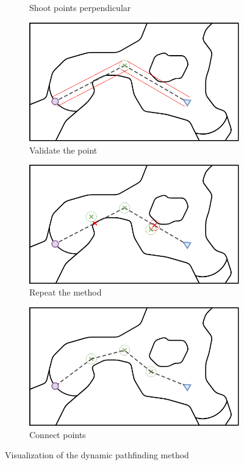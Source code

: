 \documentclass[../main.tex]{subfiles}
\begin{document}
\begin{figure}[H]
\begin{subfigure}[b]{0.45\textwidth}
		\caption{Shoot points perpendicular}
		\label{fig:shoot_line}
	\end{subfigure}
	\hfill
	\begin{subfigure}[b]{0.45\textwidth}
		\centering
		\includegraphics[width=\textwidth]{IMAGES/part3/methode4.png}
		\caption{Validate the point}
		\label{fig:validate_point}
	\end{subfigure}
	\vfill
	\begin{subfigure}[b]{0.45\textwidth}
		\centering
		\includegraphics[width=\textwidth]{IMAGES/part3/methode5.png}
		\caption{Repeat the method}
		\label{fig:repeat_method}
	\end{subfigure}
	\hfill
	\begin{subfigure}[b]{0.45\textwidth}
		\centering
		\includegraphics[width=\textwidth]{IMAGES/part3/methode6.png}
		\caption{Connect points}
		\label{fig:idk}
	\end{subfigure}
	\caption{Visualization of the dynamic pathfinding method}
	\label{fig:method_visu}
\end{figure}
\end{document}
